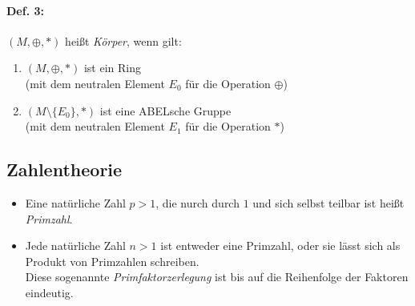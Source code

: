 \paragraph{Def. 3:}\parskp
$(M, \oplus, *)$ heißt \emph{Körper}, wenn gilt:
\begin{enumerate}
\item $(M,\oplus, *)$ ist ein Ring \\
(mit dem neutralen Element $E_0$ für die Operation $\oplus$)
\item $(M\setminus \{E_0\}, *)$ ist eine ABELsche Gruppe\\
(mit dem neutralen Element $E_1$ für die Operation $*$)
\end{enumerate}

\subsection{Zahlentheorie}
\begin{itemize}
\item Eine natürliche Zahl $p>1$, die nurch durch $1$ und sich selbst teilbar ist heißt \emph{Primzahl}.
\item Jede natürliche Zahl $n>1$ ist entweder eine Primzahl, oder sie lässt sich als Produkt von Primzahlen schreiben.\\
Diese sogenannte \emph{Primfaktorzerlegung} ist bis auf die Reihenfolge der Faktoren eindeutig.
\end{itemize}

